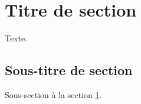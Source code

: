 \newpage
\section{Titre de section}\label{sec:nom-de-section}
Texte.

\subsection{Sous-titre de section}\label{sec:nom-de-sous-section}
Sous-section à la section \ref{sec:nom-de-section}.



